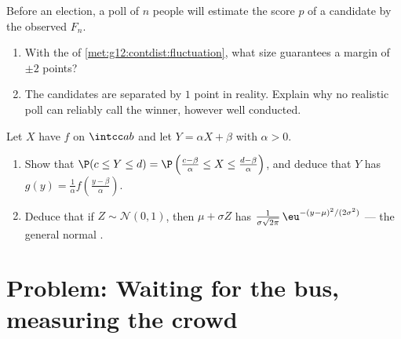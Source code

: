 \begin{exercise}[$\star\star\star$]\label{exo:g12:contdist:8}
Before an election, a poll of $n$ people will estimate the score $p$ of a
candidate by the observed  $F_n$.
\begin{enumerate}
  \item With the  of
        \cref{met:g12:contdist:fluctuation}, what  size guarantees a
        margin of $\pm 2$ points?
  \item The candidates are separated by $1$ point in reality. Explain why
        no realistic poll can reliably call the winner, however well
        conducted.
\end{enumerate}
\end{exercise}

\begin{exercise}[$\star\star\star$]\label{exo:g12:contdist:9}
Let $X$ have  $f$ on $\intcc ab$ and let
$Y = \alpha X + \beta$ with $\alpha > 0$.
\begin{enumerate}
  \item Show that $\P(c \leq Y \leq d)
        = \P\left(\frac{c - \beta}{\alpha} \leq X \leq
        \frac{d-\beta}{\alpha}\right)$, and deduce that $Y$ has 
        $g(y) = \frac{1}{\alpha} f\left(\frac{y - \beta}{\alpha}\right)$.
  \item Deduce that if $Z \sim \mathcal N(0,1)$, then
        $\mu + \sigma Z$ has 
        $\frac{1}{\sigma\sqrt{2\pi}}\,
        \eu^{-(y - \mu)^2/(2\sigma^2)}$ --- the general normal .
\end{enumerate}
\end{exercise}

\section{Problem: Waiting for the bus, measuring the crowd}

